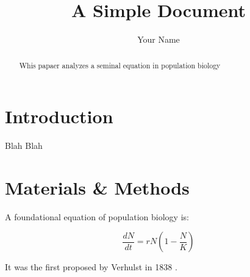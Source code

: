 \documentclass[12pt]{article}
\title{A Simple Document}
\author{Your Name}
\date{}
\begin{document}
    \maketitle

    \begin{abstract}
        Whis papaer analyzes a seminal equation in population biology
    \end{abstract}

    \section{Introduction}
        Blah  Blah
    
    \section{Materials \& Methods}

    A foundational equation of population biology is:

    \begin{equation}
        \frac{dN}{dt} =r N (1 - \frac {N}{K})
    \end{equation}

    It was the first proposed by Verhulst in 1838 \cite{verhulst1833notice}.

    
\end{document}
